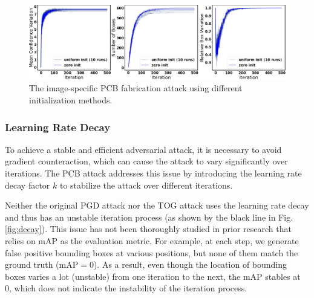 
\begin{figure}[H]
    \centering
    \includegraphics[width=\linewidth]{figures/chapter_detection/hardware/init.png}
    \caption{The image-specific  PCB fabrication attack using different initialization methods.}
    \label{fig:init}
\end{figure}

\subsubsection{Learning Rate Decay}

To achieve a stable and efficient adversarial attack, it is necessary to avoid gradient counteraction, which can cause the attack to vary significantly over iterations. The PCB attack addresses this issue by introducing the learning rate decay factor $k$ to stabilize the attack over different iterations.

Neither the original PGD attack nor the TOG attack uses the learning rate decay and thus has an unstable iteration process (as shown by the black line in Fig. \ref{fig:decay}). This issue has not been thoroughly studied in prior research that relies on mAP as the evaluation metric. For example, at each step, we generate false positive bounding boxes at various positions, but none of them match the ground truth (mAP$=0$). As a result, even though the location of bounding boxes varies a lot (unstable) from one iteration to the next, the mAP stables at 0, which does not indicate the instability of the iteration process.

